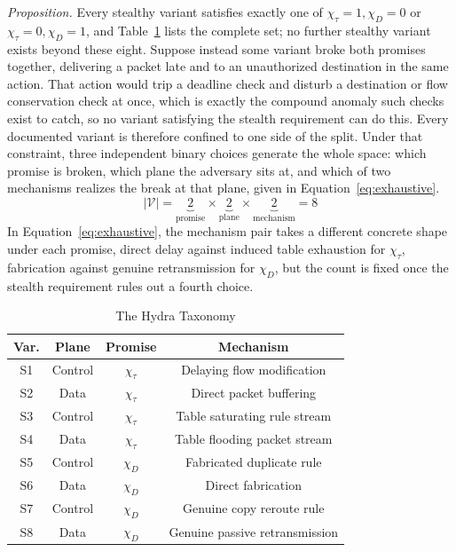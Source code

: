 \documentclass[lettersize,journal]{IEEEtran}
\begin{document}
\textit{Proposition.} Every stealthy variant satisfies exactly one of $\chi_\tau{=}1,\chi_D{=}0$ or $\chi_\tau{=}0,\chi_D{=}1$, and Table~\ref{tab:taxonomy} lists the complete set; no further stealthy variant exists beyond these eight. Suppose instead some variant broke both promises together, delivering a packet late and to an unauthorized destination in the same action. That action would trip a deadline check and disturb a destination or flow conservation check at once, which is exactly the compound anomaly such checks exist to catch, so no variant satisfying the stealth requirement can do this. Every documented variant is therefore confined to one side of the split. Under that constraint, three independent binary choices generate the whole space: which promise is broken, which plane the adversary sits at, and which of two mechanisms realizes the break at that plane, given in Equation~\eqref{eq:exhaustive}.
\begin{equation}
|\mathcal{V}| = \underbrace{2}_{\text{promise}} \times \underbrace{2}_{\text{plane}} \times \underbrace{2}_{\text{mechanism}} = 8
\label{eq:exhaustive}
\end{equation}
In Equation~\eqref{eq:exhaustive}, the mechanism pair takes a different concrete shape under each promise, direct delay against induced table exhaustion for $\chi_\tau$, fabrication against genuine retransmission for $\chi_D$, but the count is fixed once the stealth requirement rules out a fourth choice.

\begin{table}[t]
\centering
\caption{The Hydra Taxonomy}
\label{tab:taxonomy}
\footnotesize
\begin{tabular}{|c|c|c|c|}
\hline
\textbf{Var.} & \textbf{Plane} & \textbf{Promise} & \textbf{Mechanism} \\
\hline
S1 & Control & $\chi_\tau$ & Delaying flow modification \\
\hline
S2 & Data & $\chi_\tau$ & Direct packet buffering \\
\hline
S3 & Control & $\chi_\tau$ & Table saturating rule stream \\
\hline
S4 & Data & $\chi_\tau$ & Table flooding packet stream \\
\hline
S5 & Control & $\chi_D$ & Fabricated duplicate rule \\
\hline
S6 & Data & $\chi_D$ & Direct fabrication \\
\hline
S7 & Control & $\chi_D$ & Genuine copy reroute rule \\
\hline
S8 & Data & $\chi_D$ & Genuine passive retransmission \\
\hline
\end{tabular}
\end{table}
\end{document}
